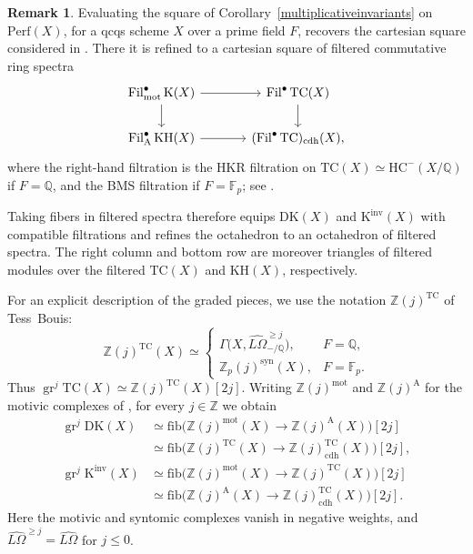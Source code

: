 \documentclass{amsart}
\theoremstyle{plain}
\theoremstyle{definition}
\newtheorem{remark}[prop]{Remark}
\newcommand{\bbF}{\mathbb{F}}
\newcommand{\bbQ}{\mathbb{Q}}
\newcommand{\bbZ}{\mathbb{Z}}
\newcommand{\Perf}{\mathrm{Perf}}
\newcommand{\TC}{\mathrm{TC}}
\newcommand{\HC}{\mathrm{HC}}
\newcommand{\fib}{\mathrm{fib}}
\newcommand{\K}{\mathrm{K}}
\newcommand{\KH}{\mathrm{KH}}
\newcommand{\DK}{\mathrm{DK}}
\DeclareMathOperator{\gr}{gr}
\DeclareMathOperator{\Fil}{Fil}
\newcommand{\cdh}{\mathrm{cdh}}
\begin{document}
\begin{remark}
Evaluating the square of Corollary~\ref{multiplicativeinvariants}
on $\Perf(X)$, for a qcqs scheme $X$ over a prime field $F$, recovers the cartesian square considered in \cite{EM26}. There it is refined to a cartesian square of filtered commutative ring spectra
\[
\begin{tikzcd}[column sep=large]
\Fil^{\bullet}_{\mathrm{mot}}\K(X)
  \arrow[r]\arrow[d]
&
\Fil^{\bullet}\TC(X)\arrow[d]
\\
\Fil^{\bullet}_{\mathrm A}\KH(X)\arrow[r]
&
(\Fil^{\bullet}\TC)_{\cdh}(X),
\end{tikzcd}
\]
where the right-hand filtration is the HKR filtration on
$\TC(X)\simeq \HC^-(X/\bbQ)$ if $F=\bbQ$, and the BMS filtration if $F=\bbF_p$; see
\cite[Definitions 4.9 and 4.28]{EM26}.


Taking fibers in filtered spectra therefore equips $\DK(X)$
and $\K^{\mathrm{inv}}(X)$ with compatible filtrations and refines the octahedron to an octahedron of filtered spectra.
The right column and bottom row are moreover triangles of filtered modules over the filtered $\TC(X)$ and $\KH(X)$, respectively.

For an explicit description of the graded pieces, we use the notation $\bbZ(j)^{\TC}$ of Tess~Bouis:
\[
\bbZ(j)^{\TC}(X)\simeq
\begin{cases}
\Gamma\bigl(X,\widehat{L\Omega}_{-/\bbQ}^{\ge j}\bigr),
  & F=\bbQ,\\
\bbZ_p(j)^{\mathrm{syn}}(X),
  & F=\bbF_p.
\end{cases}
\]
Thus
$\gr^j\TC(X)\simeq\bbZ(j)^{\TC}(X)[2j]$.
Writing $\bbZ(j)^{\mathrm{mot}}$ and $\bbZ(j)^{\mathrm A}$
for the motivic complexes of \cite{EM26}, for every $j\in\bbZ$ we obtain
\[
\begin{aligned}
\gr^j\DK(X)
&\simeq
\fib\bigl(
\bbZ(j)^{\mathrm{mot}}(X)\longrightarrow
\bbZ(j)^{\mathrm A}(X)
\bigr)[2j]\\
&\simeq
\fib\bigl(
\bbZ(j)^{\TC}(X)\longrightarrow
\bbZ(j)_{\cdh}^{\TC}(X)
\bigr)[2j],
\\[1mm]
\gr^j\K^{\mathrm{inv}}(X)
&\simeq
\fib\bigl(
\bbZ(j)^{\mathrm{mot}}(X)\longrightarrow
\bbZ(j)^{\TC}(X)
\bigr)[2j]\\
&\simeq
\fib\bigl(
\bbZ(j)^{\mathrm A}(X)\longrightarrow
\bbZ(j)_{\cdh}^{\TC}(X)
\bigr)[2j].
\end{aligned}
\]
Here the motivic and syntomic complexes vanish in negative weights, and
$\widehat{L\Omega}^{\ge j}=\widehat{L\Omega}$ for $j\le0$.

\end{remark}
\end{document}
